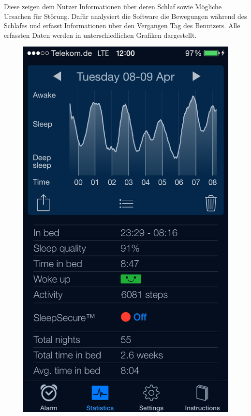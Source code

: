 Diese zeigen dem Nutzer Informationen über deren Schlaf sowie Mögliche Ursachen für Störung.
Dafür analysiert die Software die Bewegungen während des Schlafes und erfasst Informationen über den Vergangen Tag des Benutzers.
Alle erfassten Daten werden in unterschiedlichen Grafiken dargestellt.

 

\begin{figure}[htbp]
  \centering
  \begin{minipage}[b]{0.47\textwidth}
    \centering
    \includegraphics[scale=0.3]{images/SleepCycle/Detail} 

\end{minipage}
\end{figure}
